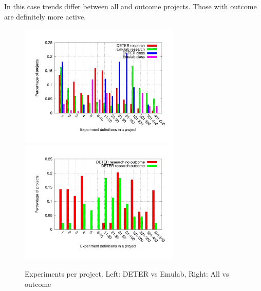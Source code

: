 \documentclass[10pt, twocolumn]{article} %
\begin{document}
In this case trends differ between all and outcome projects. Those with
outcome are definitely more active. \begin{figure}[htbp] \begin{center}
\includegraphics[width=3in,
type=pdf,ext=.pdf,read=.pdf]{figs/proj.size.gnu}
\includegraphics[width=3in,
type=pdf,ext=.pdf,read=.pdf]{figs/proj.size.cmp.gnu}
\caption{Experiments per project. Left: DETER vs Emulab, Right: All vs
outcome} \label{projsize} \end{center} \end{figure}
\end{document}

